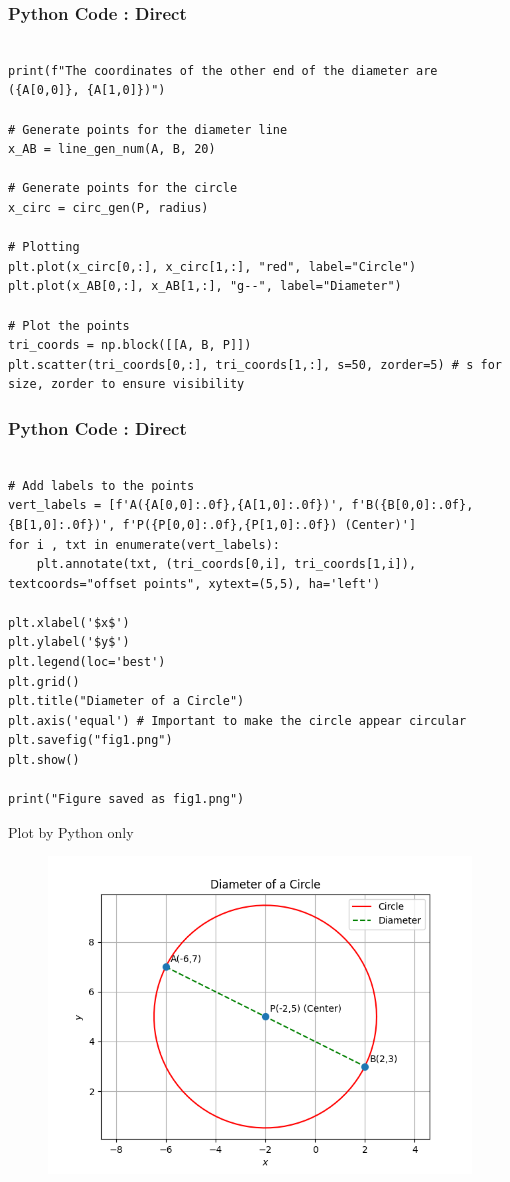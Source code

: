 \documentclass{beamer}
\begin{document}
\begin{frame}[fragile]
\frametitle{Python Code : Direct }

\begin{lstlisting}

print(f"The coordinates of the other end of the diameter are ({A[0,0]}, {A[1,0]})")

# Generate points for the diameter line
x_AB = line_gen_num(A, B, 20)

# Generate points for the circle
x_circ = circ_gen(P, radius)

# Plotting
plt.plot(x_circ[0,:], x_circ[1,:], "red", label="Circle")
plt.plot(x_AB[0,:], x_AB[1,:], "g--", label="Diameter")

# Plot the points
tri_coords = np.block([[A, B, P]])
plt.scatter(tri_coords[0,:], tri_coords[1,:], s=50, zorder=5) # s for size, zorder to ensure visibility
\end{lstlisting}
\end{frame}
\begin{frame}[fragile]
\frametitle{Python Code : Direct }

\begin{lstlisting}

# Add labels to the points
vert_labels = [f'A({A[0,0]:.0f},{A[1,0]:.0f})', f'B({B[0,0]:.0f},{B[1,0]:.0f})', f'P({P[0,0]:.0f},{P[1,0]:.0f}) (Center)']
for i , txt in enumerate(vert_labels):
    plt.annotate(txt, (tri_coords[0,i], tri_coords[1,i]), textcoords="offset points", xytext=(5,5), ha='left')

plt.xlabel('$x$')
plt.ylabel('$y$')
plt.legend(loc='best')
plt.grid()
plt.title("Diameter of a Circle")
plt.axis('equal') # Important to make the circle appear circular
plt.savefig("fig1.png")
plt.show()

print("Figure saved as fig1.png")

\end{lstlisting}

\end{frame}

\begin{frame}{Plot by Python only}
\begin{figure}[H]
        \centering
        \includegraphics[width=0.7\columnwidth]{../figs/fig1.png}
        \caption{}
        \label{fig:1}
    \end{figure}
\end{frame}
\end{document}
